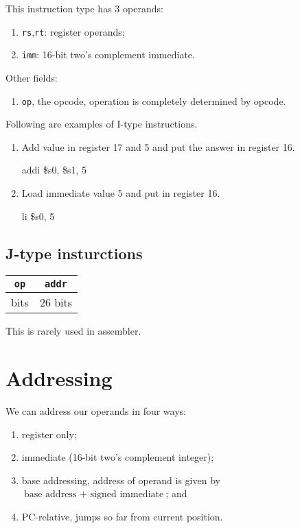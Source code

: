 This instruction type has 3 operands:
\begin{enumerate}
    \item \texttt{rs},\texttt{rt}: register operands;
    \item \texttt{imm}: 16-bit two's complement immediate.
\end{enumerate}
Other fields:
\begin{enumerate}
    \item \texttt{op}, the opcode, operation is completely determined by opcode.
\end{enumerate}

\begin{example}
    Following are examples of I-type instructions.
    \begin{enumerate}
        \item Add value in register 17 and 5 and put the answer in register 16.
        \begin{center}
            \ttfamily 
            addi \$s0, \$s1, 5
        \end{center}
        
        \item Load immediate value 5 and put in register 16.
        \begin{center}
            \ttfamily 
            li \$s0, 5
        \end{center}
    \end{enumerate}
\end{example}

\subsection{J-type insturctions}

\begin{center}
    \begin{tabular}{cc}
        \toprule
        \texttt{op} & \texttt{addr} \\
        \bottomrule
        \addlinespace
        6 bits & 26 bits
    \end{tabular}
\end{center}

This is rarely used in assembler.

\section{Addressing}

We can address our operands in four ways:
\begin{enumerate}
    \item register only;
    \item immediate (16-bit two's complement integer);
    \item base addressing, address of operand is given by $\text{base address }+\text{ signed immediate}$; and
    \item PC-relative, jumps so far from current position.
\end{enumerate}

